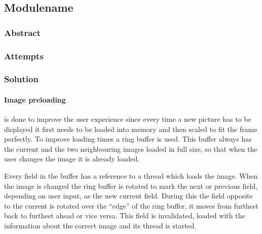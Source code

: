 \subsection{Modulename}
\def\kapitelautor{}

\subsubsection{Abstract}

\subsubsection{Attempts}

\subsubsection{Solution} %

\paragraph{Image preloading} is done to improve the user experience since every
time a new picture has to be displayed it first needs to be loaded into memory
and then scaled to fit the frame perfectly. To improve loading times a ring
buffer is used. This buffer always has the current and the two neighbouring
images loaded in full size, so that when the user changes the image it is
already loaded.

Every field in the buffer has a reference to a thread which loads the image.
When the image is changed the ring buffer is rotated to mark the next or
previous field, depending on user input, as the new current field. During this
the field opposite to the current is rotated over the ``edge'' of the ring
buffer, it moves from furthest back to furthest ahead or vice versa. This field
is invalidated, loaded with the information about the correct image and its
thread is started.
